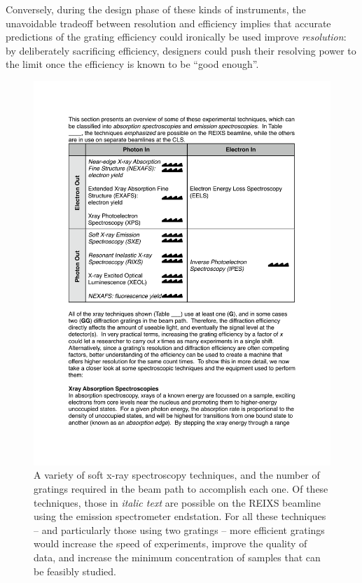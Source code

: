  Conversely, during the design phase of these kinds of instruments, the unavoidable tradeoff between resolution and efficiency implies that accurate predictions of the grating efficiency could ironically be used improve \emph{resolution}: by deliberately sacrificing efficiency, designers could push their resolving power to the limit once the efficiency is known to be ``good enough''.
 
 \begin{figure}[htbp] %
   \centering
   \includegraphics[scale=0.8]{../data/Chapter1/1h_techniques/1h.pdf} 
   \caption[A variety of soft x-ray spectroscopy techniques, and the number of gratings required in the beam path to accomplish each one.]{A variety of soft x-ray spectroscopy techniques, and the number of gratings required in the beam path to accomplish each one.  Of these techniques, those in \emph{italic text} are possible on the REIXS beamline using the emission spectrometer endstation.  For all these techniques -- and particularly those using two gratings -- more efficient gratings would increase the speed of experiments, improve the quality of data, and increase the minimum concentration of samples that can be feasibly studied.}
   \label{1h}
\end{figure}
 